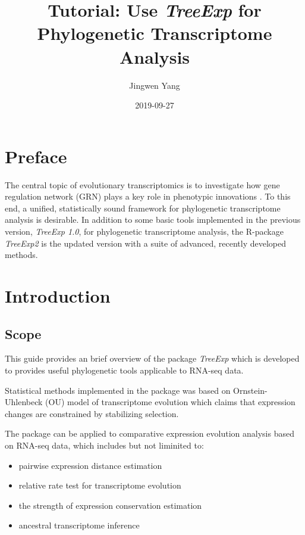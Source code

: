 \documentclass[]{book}
\title{Tutorial: Use \emph{TreeExp} for Phylogenetic Transcriptome Analysis}
\author{Jingwen Yang}
\date{2019-09-27}
\providecommand{\tightlist}{%
  \setlength{\itemsep}{0pt}\setlength{\parskip}{0pt}}
\begin{document}
\maketitle

{
\setcounter{tocdepth}{1}
\tableofcontents
}
\hypertarget{preface}{%
\chapter{Preface}\label{preface}}

The central topic of evolutionary transcriptomics is to investigate how gene regulation network (GRN) plays a key role in phenotypic innovations \citep[\citet{harrison2012}\citet{lehner2013}]{king1975}. To this end, a unified, statistically sound framework for phylogenetic transcriptome analysis is desirable. In addition to some basic tools implemented in the previous version, \emph{TreeExp 1.0}\citep{doi:10.1002/jez.b.22707}, for phylogenetic transcriptome analysis, the R-package \emph{TreeExp2} is the updated version with a suite of advanced, recently developed methods.

\hypertarget{introduction}{%
\chapter{Introduction}\label{introduction}}

\hypertarget{scope}{%
\section{Scope}\label{scope}}

This guide provides an brief overview of the package \emph{TreeExp} which is developed to provides useful phylogenetic tools applicable to RNA-seq data.

Statistical methods implemented in the package was based on Ornstein-Uhlenbeck (OU) model of transcriptome evolution which claims that expression changes are constrained by stabilizing selection.

The package can be applied to comparative expression evolution analysis based on RNA-seq data, which includes but not liminited to:

\begin{itemize}
\tightlist
\item
  pairwise expression distance estimation
\item
  relative rate test for transcriptome evolution
\item
  the strength of expression conservation estimation
\item
  ancestral transcriptome inference
\end{itemize}
\end{document}
